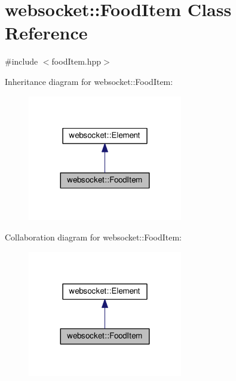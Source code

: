 \hypertarget{classwebsocket_1_1FoodItem}{}\section{websocket\+:\+:Food\+Item Class Reference}
\label{classwebsocket_1_1FoodItem}


{\ttfamily \#include $<$food\+Item.\+hpp$>$}



Inheritance diagram for websocket\+:\+:Food\+Item\+:\nopagebreak
\begin{figure}[H]
\begin{center}
\leavevmode
\includegraphics[width=191pt]{classwebsocket_1_1FoodItem__inherit__graph}
\end{center}
\end{figure}


Collaboration diagram for websocket\+:\+:Food\+Item\+:\nopagebreak
\begin{figure}[H]
\begin{center}
\leavevmode
\includegraphics[width=191pt]{classwebsocket_1_1FoodItem__coll__graph}
\end{center}
\end{figure}
